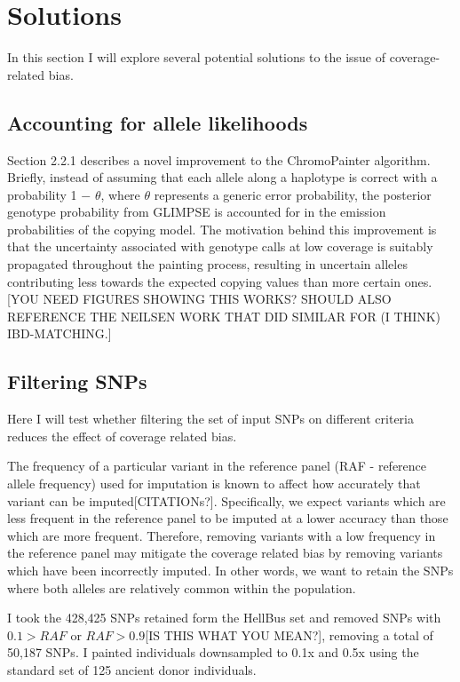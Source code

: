 \section{Solutions}

In this section I will explore several potential solutions to the issue of coverage-related bias.

\subsection{Accounting for allele likelihoods}

Section 2.2.1 describes a novel improvement to the ChromoPainter algorithm. Briefly, instead of assuming that each allele along a haplotype is correct with a probability 1 $-$ $\theta$, where $\theta$ represents a generic error probability, the posterior genotype probability from GLIMPSE is accounted for in the emission probabilities of the copying model. The motivation behind this improvement is that the uncertainty associated with genotype calls at low coverage is suitably propagated throughout the painting process, resulting in uncertain alleles contributing less towards the expected copying values than more certain ones.{\color{red}[YOU NEED FIGURES SHOWING THIS WORKS? SHOULD ALSO REFERENCE THE NEILSEN WORK THAT DID SIMILAR FOR (I THINK) IBD-MATCHING.]}


\subsection{Filtering SNPs}

Here I will test whether filtering the set of input SNPs on different criteria reduces the effect of coverage related bias. 

The frequency of a particular variant in the reference panel (RAF - reference allele frequency) used for imputation is {\color{red}known} to affect how accurately that variant can be imputed{\color{red}[CITATIONs?]}. Specifically, we expect variants which are less frequent in the reference panel to be imputed at a lower accuracy than those which are more frequent. Therefore, removing variants with a low frequency in the reference panel may mitigate the coverage related bias by removing variants which have been incorrectly imputed. In other words, we want to retain the SNPs {\color{red}where} both alleles are relatively common within the population. 

I took the 428,425 SNPs retained form the HellBus set and removed SNPs with {\color{red}$0.1 > RAF$ or $RAF > 0.9$[IS THIS WHAT YOU MEAN?]}, removing a total of 50,187 SNPs. I painted individuals downsampled to 0.1x and 0.5x using the standard set of 125 ancient donor individuals. 

